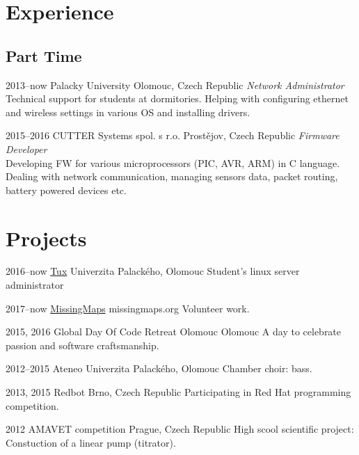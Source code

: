 \documentclass[]{friggeri-cv} %
\begin{document}

\section{Experience}

\subsection{Part Time}
\begin{entrylist}

\entry
{2013--now}
{Palacky University}
{Olomouc, Czech Republic}
{\emph{Network Administrator} \\
Technical support for students at dormitories. Helping with configuring ethernet and wireless settings in various OS and installing drivers.}

\entry
{2015--2016}
{CUTTER Systems spol. s r.o.}
{Prostějov, Czech Republic}
{\emph{Firmware Developer} \\
Developing FW for various microprocessors (PIC, AVR, ARM) in C language. Dealing with network communication, managing sensors data, packet routing, battery powered devices etc.}

\end{entrylist}

\section{Projects}

\begin{entrylist}
\entry
{2016--now}
{\href{https://tux.inf.upol.cz}{Tux}}
{Univerzita Palackého, Olomouc}
{Student's linux server administrator}

\entry
{2017--now}
{\href{http://www.missingmaps.org/users/\#/5438501}{MissingMaps}}
{missingmaps.org}
{Volunteer work.}

\entry
{2015, 2016}
{Global Day Of Code Retreat Olomouc}
{Olomouc}
{A day to celebrate passion and software craftsmanship.}

\entry
{2012--2015}
{Ateneo}
{Univerzita Palackého, Olomouc}
{Chamber choir: bass.}

\entry
{2013, 2015}
{Redbot}
{Brno, Czech Republic}
{Participating in Red Hat programming competition.}

\entry
{2012}
{AMAVET competition}
{Prague, Czech Republic}
{High scool scientific project: Constuction of a linear pump (titrator).}

\end{entrylist}
\end{document}
